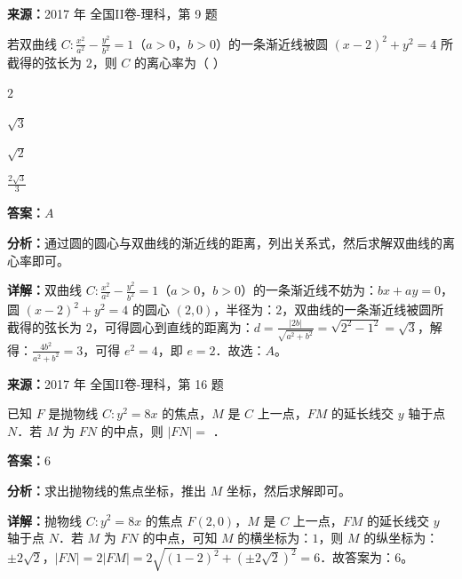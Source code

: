 \begin{question}[points=5]
\textbf{来源：}2017 年 全国II卷-理科，第 9 题\par
若双曲线 $C:\frac{x^2}{a^2}-\frac{y^2}{b^2}=1$（$a>0$，$b>0$）的一条渐近线被圆 $(x-2)^2+y^2=4$ 所截得的弦长为 $2$，则 $C$ 的离心率为（   ）
\begin{choices}
  \item $2$
  \item $\sqrt{3}$
  \item $\sqrt{2}$
  \item $\frac{2\sqrt{3}}{3}$
\end{choices}
\begin{solution}
\textbf{答案：}$A$

\textbf{分析：}通过圆的圆心与双曲线的渐近线的距离，列出关系式，然后求解双曲线的离心率即可。

\textbf{详解：}双曲线 $C:\frac{x^2}{a^2}-\frac{y^2}{b^2}=1$（$a>0$，$b>0$）的一条渐近线不妨为：$bx+ay=0$，圆 $(x-2)^2+y^2=4$ 的圆心 $(2,0)$，半径为：$2$，双曲线的一条渐近线被圆所截得的弦长为 $2$，可得圆心到直线的距离为：$d=\frac{|2b|}{\sqrt{a^2+b^2}}=\sqrt{2^2-1^2}=\sqrt{3}$，解得：$\frac{4b^2}{a^2+b^2}=3$，可得 $e^2=4$，即 $e=2$．故选：$A$。
\end{solution}
\end{question}

\begin{question}[points=5]
\textbf{来源：}2017 年 全国II卷-理科，第 16 题\par
已知 $F$ 是抛物线 $C:y^2=8x$ 的焦点，$M$ 是 $C$ 上一点，$FM$ 的延长线交 $y$ 轴于点 $N$．若 $M$ 为 $FN$ 的中点，则 $|FN|=$ ．
\fillin[{$6$}]
\begin{solution}
\textbf{答案：}$6$

\textbf{分析：}求出抛物线的焦点坐标，推出 $M$ 坐标，然后求解即可。

\textbf{详解：}抛物线 $C:y^2=8x$ 的焦点 $F(2,0)$，$M$ 是 $C$ 上一点，$FM$ 的延长线交 $y$ 轴于点 $N$．若 $M$ 为 $FN$ 的中点，可知 $M$ 的横坐标为：$1$，则 $M$ 的纵坐标为：$\pm2\sqrt{2}$，$|FN|=2|FM|=2\sqrt{(1-2)^2+(\pm2\sqrt{2})^2}=6$．故答案为：$6$。
\end{solution}
\end{question}

